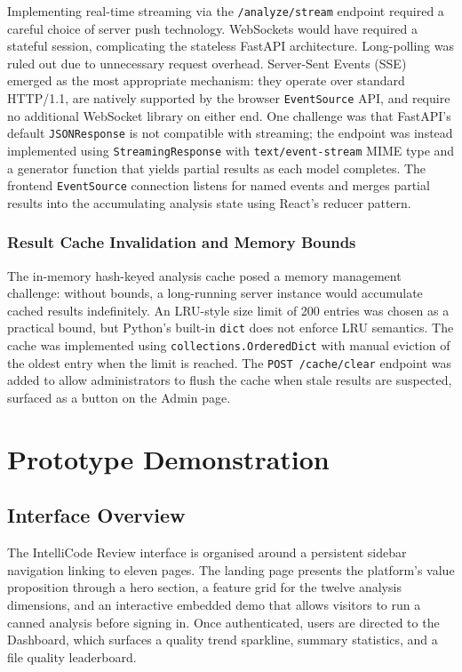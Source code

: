 \documentclass[12pt, oneside]{report}
\begin{document}
Implementing real-time streaming via the \texttt{/analyze/stream} endpoint required
a careful choice of server push technology. WebSockets would have required a
stateful session, complicating the stateless FastAPI architecture. Long-polling was
ruled out due to unnecessary request overhead. Server-Sent Events (SSE) emerged as
the most appropriate mechanism: they operate over standard HTTP/1.1, are natively
supported by the browser \texttt{EventSource} API, and require no additional
WebSocket library on either end. One challenge was that FastAPI's default
\texttt{JSONResponse} is not compatible with streaming; the endpoint was instead
implemented using \texttt{StreamingResponse} with \texttt{text/event-stream} MIME
type and a generator function that yields partial results as each model completes.
The frontend \texttt{EventSource} connection listens for named events and merges
partial results into the accumulating analysis state using React's reducer pattern.

\subsection{Result Cache Invalidation and Memory Bounds}

The in-memory hash-keyed analysis cache posed a memory management challenge: without
bounds, a long-running server instance would accumulate cached results indefinitely.
An LRU-style size limit of 200 entries was chosen as a practical bound, but Python's
built-in \texttt{dict} does not enforce LRU semantics. The cache was implemented
using \texttt{collections.OrderedDict} with manual eviction of the oldest entry when
the limit is reached. The \texttt{POST /cache/clear} endpoint was added to allow
administrators to flush the cache when stale results are suspected, surfaced as a
button on the Admin page.

\chapter{Prototype Demonstration}
\label{ch:demo}

\section{Interface Overview}
\label{sec:ui-overview}

The IntelliCode Review interface is organised around a persistent sidebar navigation
linking to eleven pages. The landing page presents the platform's value proposition
through a hero section, a feature grid for the twelve analysis dimensions, and an
interactive embedded demo that allows visitors to run a canned analysis before signing
in. Once authenticated, users are directed to the Dashboard, which surfaces a quality
trend sparkline, summary statistics, and a file quality leaderboard.
\end{document}
